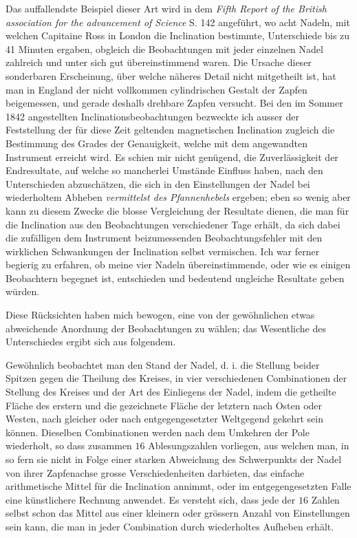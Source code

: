\expandafter\def\csname HistoricalNoteText457\endcsname{Das auffallendste Beispiel dieser Art wird in dem \textit{Fifth Report of the British association for the advancement of Science} S. 142 angeführt, wo acht Nadeln, mit welchen Capitaine Ross in London die Inclination bestimmte, Unterschiede bis zu 41 Minuten ergaben, obgleich die Beobachtungen mit jeder einzelnen Nadel zahlreich und unter sich gut übereinstimmend waren. Die Ursache dieser sonderbaren Erscheinung, über welche näheres Detail nicht mitgetheilt ist, hat man in England der nicht vollkommen cylindrischen Gestalt der Zapfen beigemessen, und gerade deshalb drehbare Zapfen versucht.}%
Bei den im Sommer 1842 angestellten Inclinationsbeobachtungen be\-zweckte ich ausser der Feststellung der für diese Zeit geltenden magnetischen Inclination zugleich die Bestimmung des Grades der Genauigkeit, welche mit dem angewandten Instrument erreicht wird. Es schien mir nicht genügend, die Zuverlässigkeit der Endresultate, auf welche so mancherlei Umstände Einfluss haben, nach den Unterschieden abzuschätzen, die sich in den Einstellungen der Nadel bei wiederholtem Abheben \textit{vermittelst des Pfannenhebels} ergeben; eben so wenig aber kann zu diesem Zwecke die blosse Vergleichung der Resultate dienen, die man für die Inclination aus den Beobachtungen verschiedener Tage erhält, da sich dabei die zufälligen dem Instrument beizumessenden Beobachtungsfehler mit den wirklichen Schwankungen der Inclination selbst vermischen. Ich war ferner begierig zu erfahren, ob meine vier Nadeln übereinstimmende, oder wie es einigen Beobachtern begegnet ist, entschieden und bedeutend ungleiche Resultate geben würden.

Diese Rücksichten haben mich bewogen, eine von der gewöhnlichen etwas abweichende Anordnung der Beobachtungen zu wählen; das Wesentliche des Unterschiedes ergibt sich aus folgendem.

Gewöhnlich beobachtet man den Stand der Nadel, d. i. die Stellung beider Spitzen gegen die Theilung des Kreises, in vier verschiedenen Combinationen der Stellung des Kreises und der Art des Einliegens der Nadel, indem die getheilte Fläche des erstern und die gezeichnete Fläche der letztern nach Osten oder Westen, nach gleicher oder nach entgegengesetzter Weltgegend gekehrt sein können. Dieselben Combinationen werden nach dem Umkehren der Pole wiederholt, so dass zusammen $16$ Ablesungszahlen vorliegen, aus welchen man, in so fern sie nicht in Folge einer starken Abweichung des Schwerpunkts der Nadel von ihrer Zapfenachse grosse Verschiedenheiten darbieten, das einfache arithmetische Mittel für die Inclination annimmt, oder im entgegengesetzten Falle eine künstlichere Rechnung anwendet. Es versteht sich, dass jede der $16$ Zahlen
selbst schon das Mittel aus einer kleinern oder grössern Anzahl von Einstellungen sein kann, die man in jeder Combination durch wiederholtes Aufheben erhält.

